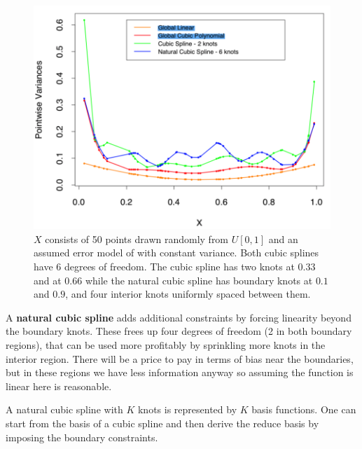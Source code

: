 \documentclass[12pt, letterpaper]{article}
\theoremstyle{definition}
\begin{document}
\begin{figure}
\centering
\includegraphics[scale=0.4]{img/pointwise_var}
\caption{$X$ consists of 50 points drawn randomly from $U[0,1]$ and an assumed error model of with constant variance. Both cubic splines have 6 degrees of freedom. The cubic spline has two knots at $0.33$ and at $0.66$ while the natural cubic spline has boundary knots at $0.1$ and $0.9$, and four interior knots uniformly spaced between them.}
\label{pointwise_var}
\end{figure}

A  \textbf{natural cubic spline} adds additional constraints by forcing linearity beyond the boundary knots. These frees up four degrees of freedom (2 in both boundary regions), that can be used more profitably by sprinkling more knots in the interior region. There will be a price to pay in terms of bias near the boundaries, but in these regions we have less information anyway so assuming the function is linear here is reasonable.

A natural cubic spline with $K$ knots is represented by $K$ basis functions. One can start from the basis of a cubic spline and then derive the reduce basis by imposing the boundary constraints.
\end{document}
